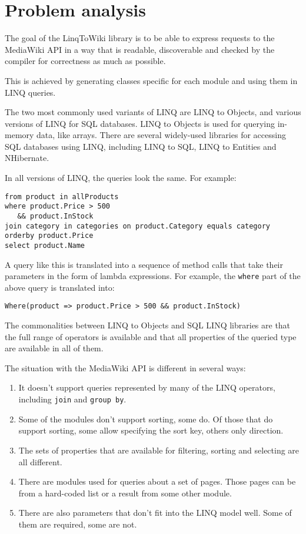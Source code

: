 \chapter{Problem analysis}
\label{goal}

The goal of the LinqToWiki library is to be able to express requests to the MediaWiki API
in a way that is readable, discoverable and checked by the compiler for correctness as much as possible.

This is achieved by generating classes specific for each module and using them in LINQ queries.

The two most commonly used variants of LINQ are LINQ to Objects, and various versions of LINQ for SQL databases.
LINQ to Objects is used for querying in-memory data, like arrays.
There are several widely-used libraries for accessing SQL databases using LINQ, including LINQ to SQL, LINQ to Entities and NHibernate.

In all versions of LINQ, the queries look the same. For example:

\begin{lstlisting}
from product in allProducts
where product.Price > 500
   && product.InStock
join category in categories on product.Category equals category
orderby product.Price
select product.Name
\end{lstlisting}

A query like this is translated into a sequence of method calls that take their parameters in the form of lambda expressions.
For example, the \lstinline{where} part of the above query is translated into:

\begin{lstlisting}
Where(product => product.Price > 500 && product.InStock)
\end{lstlisting}

The commonalities between LINQ to Objects and SQL LINQ libraries are that the full range of operators is available
and that all properties of the queried type are available in all of them.

The situation with the MediaWiki API is different in several ways:

\begin{enumerate}
\item It doesn't support queries represented by many of the LINQ operators, including \lstinline{join} and \lstinline{group by}.
\item Some of the modules don't support sorting, some do. Of those that do support sorting, some allow specifying the sort key, others only direction.
\item The sets of properties that are available for filtering, sorting and selecting are all different.
\item There are modules used for queries about a set of pages. Those pages can be from a hard-coded list or a result from some other module.
\item There are also parameters that don't fit into the LINQ model well. Some of them are required, some are not.
\end{enumerate}

